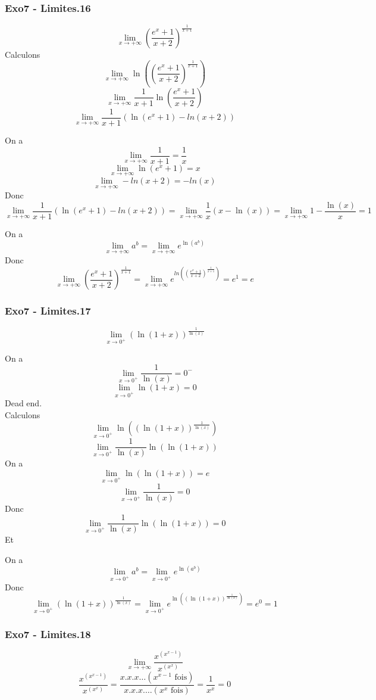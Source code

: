\documentclass[]{book}
\theoremstyle{definition}
\begin{document}
\subsubsection*{Exo7 - Limites.16}
$$\lim_{x \to +\infty} \left(\frac{e^x+1}{x+2}\right)^{\frac{1}{x+1}}$$
Calculons 
$$\lim_{x \to +\infty}\ln\left(\left(\frac{e^x+1}{x+2}\right)^{\frac{1}{x+1}}\right)$$
$$\lim_{x \to +\infty}\frac{1}{x+1} \ln\left(\frac{e^x+1}{x+2}\right)$$
$$\lim_{x \to +\infty}\frac{1}{x+1} (\ln(e^x+1)- ln(x+2))$$

On a 
$$\lim_{x \to +\infty}\frac{1}{x+1} = \frac{1}{x}$$
$$\lim_{x \to +\infty} \ln(e^x+1) = x$$
$$\lim_{x \to +\infty} -ln(x+2) = -ln(x)$$
Donc
$$\lim_{x \to +\infty}\frac{1}{x+1} (\ln(e^x+1)- ln(x+2)) = \lim_{x \to +\infty}\frac{1}{x}(x - \ln(x)) = \lim_{x \to +\infty} 1 - \frac{\ln(x)}{x} = 1$$

On a 
$$\lim_{x \to +\infty} a^b = \lim_{x \to +\infty} e^{\ln(a^b)}$$
Donc
$$\lim_{x \to +\infty} \left(\frac{e^x+1}{x+2}\right)^{\frac{1}{x+1}} = \lim_{x \to +\infty} e^{ln\left(\left(\frac{e^x+1}{x+2}\right)^{\frac{1}{x+1}}\right)} = e^1 = e$$

\subsubsection*{Exo7 - Limites.17}
$$\lim_{x \to 0^+} \left(\ln(1+x)\right)^{\frac{1}{\ln(x)}}$$

On a 
$$\lim_{x \to 0^+} \frac{1}{\ln(x)} = 0^{-}$$
$$\lim_{x \to 0^+} \ln(1+x) = 0$$
Dead end.\\

Calculons 
$$\lim_{x \to 0^+}\ln\left( \left(\ln(1+x)\right)^{\frac{1}{\ln(x)}} \right)$$
$$\lim_{x \to 0^+}\frac{1}{\ln(x)}\ln(\ln(1+x))$$
On a 
$$\lim_{x \to 0^+} \ln(\ln(1+x)) = e$$
$$\lim_{x \to 0^+} \frac{1}{\ln(x)} = 0$$
Donc
$$\lim_{x \to 0^+}\frac{1}{\ln(x)}\ln(\ln(1+x)) = 0$$
Et

On a 
$$\lim_{x \to 0^+} a^b = \lim_{x \to 0^+} e^{\ln(a^b)}$$
Donc
$$\lim_{x \to 0^+} \left(\ln(1+x)\right)^{\frac{1}{\ln(x)}} = \lim_{x \to 0^+}e^{\ln\left( \left(\ln(1+x)\right)^{\frac{1}{\ln(x)}} \right)} = e^0 = 1$$

\subsubsection*{Exo7 - Limites.18}
$$\lim_{x \to +\infty}\frac{x^{(x^{x-1})}}{x^{(x^{x})}}$$
$$\frac{x^{(x^{x-1})}}{x^{(x^{x})}} = \frac{x.x.x\ldots (x^{x-1} \textrm{ fois})}{x.x.x.\ldots (x^{x} \textrm{ fois})} =  \frac{1}{x^x} = 0$$
\end{document}
